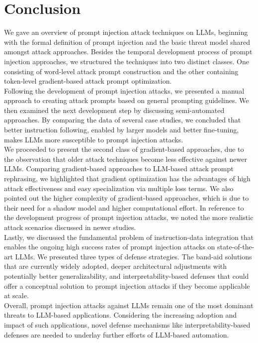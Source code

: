 \section{Conclusion}
We gave an overview of prompt injection attack techniques on LLMs, beginning with the formal definition of prompt injection and the basic threat model shared amongst attack approaches.
Besides the temporal development process of prompt injection approaches, we structured the techniques into two distinct classes.
One consisting of word-level attack prompt construction and the other containing token-level gradient-based attack prompt optimization.\\

Following the development of prompt injection attacks, we presented a manual approach to creating attack prompts based on general prompting guidelines.
We then examined the next development step by discussing semi-automated approaches.
By comparing the data of several case studies, we concluded that better instruction following, enabled by larger models and better fine-tuning, makes LLMs more susceptible to prompt injection attacks.\\

We proceeded to present the second class of gradient-based approaches, due to the observation that older attack techniques become less effective against newer LLMs.
Comparing gradient-based approaches to LLM-based attack prompt rephrasing, we highlighted that gradient optimization has the advantages of high attack effectiveness and easy specialization via multiple loss terms.
We also pointed out the higher complexity of gradient-based approaches, which is due to their need for a shadow model and higher computational effort.
In reference to the development progress of prompt injection attacks, we noted the more realistic attack scenarios discussed in newer studies.\\

Lastly, we discussed the fundamental problem of instruction-data integration that enables the ongoing high success rates of prompt injection attacks on state-of-the-art LLMs.
We presented three types of defense strategies.
The band-aid solutions that are currently widely adopted, deeper architectural adjustments with potentially better generalizability, and interpretability-based defenses that could offer a conceptual solution to prompt injection attacks if they become applicable at scale.\\

Overall, prompt injection attacks against LLMs remain one of the most dominant threats to LLM-based applications.
Considering the increasing adoption and impact of such applications, novel defense mechanisms like interpretability-based defenses are needed to underlay further efforts of LLM-based automation.